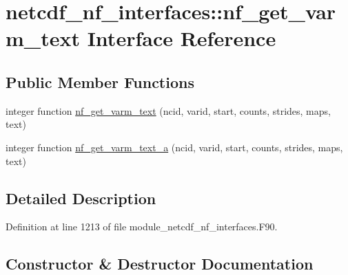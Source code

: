 \hypertarget{interfacenetcdf__nf__interfaces_1_1nf__get__varm__text}{}\section{netcdf\+\_\+nf\+\_\+interfaces\+:\+:nf\+\_\+get\+\_\+varm\+\_\+text Interface Reference}
\label{interfacenetcdf__nf__interfaces_1_1nf__get__varm__text}
\subsection*{Public Member Functions}
\begin{DoxyCompactItemize}
\item 
integer function \hyperlink{interfacenetcdf__nf__interfaces_1_1nf__get__varm__text_ab0d74c24973d6359651eeebef5926ac6}{nf\+\_\+get\+\_\+varm\+\_\+text} (ncid, varid, start, counts, strides, maps, text)
\item 
integer function \hyperlink{interfacenetcdf__nf__interfaces_1_1nf__get__varm__text_adf6138dd1c3f7a7f5f3ddc244b7434cd}{nf\+\_\+get\+\_\+varm\+\_\+text\+\_\+a} (ncid, varid, start, counts, strides, maps, text)
\end{DoxyCompactItemize}


\subsection{Detailed Description}


Definition at line 1213 of file module\+\_\+netcdf\+\_\+nf\+\_\+interfaces.\+F90.



\subsection{Constructor \& Destructor Documentation}
\mbox{\label{interfacenetcdf__nf__interfaces_1_1nf__get__varm__text_ab0d74c24973d6359651eeebef5926ac6}} 
